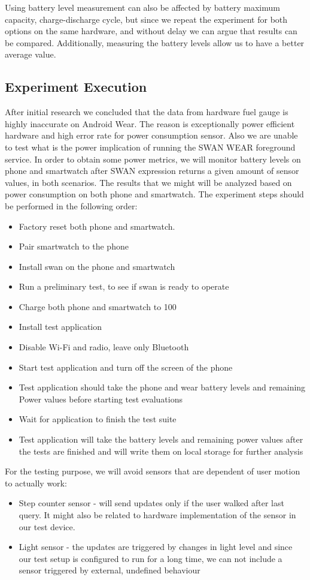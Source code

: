  Using battery level measurement can also be affected by battery maximum capacity, charge-discharge cycle, but since we repeat the experiment for both options on the same hardware, and without delay we can argue that results can be compared.
 Additionally, measuring the battery levels allow us to have a better average value.
 
 \subsection{Experiment Execution}
 After initial research we concluded that the data from hardware fuel gauge is highly inaccurate on Android Wear.
 The reason is exceptionally power efficient hardware and high error rate for power consumption sensor. 
 Also we are unable to test what is the power implication of running the SWAN WEAR foreground service. 
 In order to obtain some power metrics, we will monitor battery levels on phone and smartwatch after SWAN expression returns a given amount of sensor values, in both scenarios.
The results that we might will be analyzed based on power consumption on both phone and smartwatch.
The experiment steps should be performed in the following order:
\begin{itemize}
 \item Factory reset both phone and smartwatch.
 \item Pair smartwatch to the phone
 \item Install swan on the phone and smartwatch
 \item Run a preliminary test, to see if swan is ready to operate
 \item Charge both phone and smartwatch to 100%
 \item Install test application
 \item Disable Wi-Fi and radio, leave only Bluetooth
 \item Start test application and turn off the screen of the phone
 \item Test application should take the phone and wear battery levels and remaining Power values before starting test evaluations
 \item Wait for application to finish the test suite
 \item Test application will take the battery levels and remaining power values after the tests are finished and will write them on local storage for further analysis
\end{itemize}

For the testing purpose, we will avoid sensors that are dependent of user motion to actually work: 
\begin{itemize}
 \item Step counter sensor - will send updates only if the user walked after last query. It might also be related to hardware implementation of the sensor in our test device. 
 \item Light sensor - the updates are triggered by changes in light level and since our test setup is configured to run for a long time, we can not include a sensor triggered by external,
 undefined behaviour
\end{itemize}

